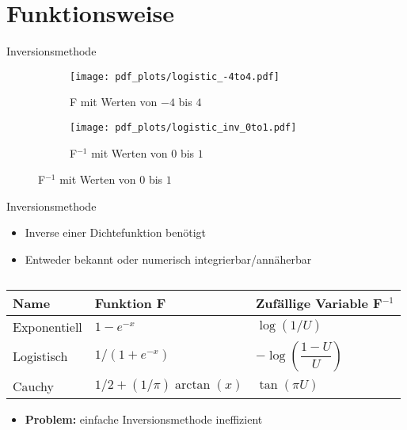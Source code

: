 \section{Funktionsweise}

\begin{frame}{Inversionsmethode}
	\begin{figure}
		\begin{subfigure}{.45\textwidth}
			\centering
			\texttt{[image: pdf\_plots/logistic\_-4to4.pdf]}
            \caption{F mit Werten von $-4$ bis $4$}
		\end{subfigure}
		\begin{subfigure}{.45\textwidth}
			\centering
			\texttt{[image: pdf\_plots/logistic\_inv\_0to1.pdf]}
            \caption{F$^{-1}$ mit Werten von $0$ bis $1$}
		\end{subfigure}
	\end{figure}
\end{frame}

\begin{frame}{Inversionsmethode}
    \begin{itemize}
        \item Inverse einer Dichtefunktion benötigt 
        \item Entweder bekannt %
            oder numerisch integrierbar/annäherbar
    \end{itemize}
    \begin{table}%
        \centering
        \begin{tabular}{l|l|l}
            Name         & Funktion F & Zufällige Variable F$^{-1}$ \\
            \hline\hline %
            Exponentiell & $1 - e^{-x}$ & $\log(1/U)$ \\ %
            Logistisch   & $1 / (1 + e^{-x})$ & $-\log(\dfrac{1-U}{U})$ \\ %
            Cauchy       & $1/2 + (1/\pi) \arctan(x)$ & $\tan(\pi U)$
        \end{tabular}
        \caption{\small\cite{devroye-non_uniform_random_variate-1986}\normalsize}
    \end{table}
    \begin{itemize}[label=$\rightarrow$]
        \item<2-> \textbf{Problem:} einfache Inversionsmethode ineffizient
    \end{itemize}
\end{frame}

